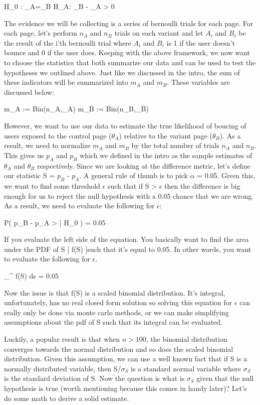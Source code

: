 \beq
    H_0 : \theta_A=\theta_B
\eeq
\beq
   H_A: \theta_B - \theta_A > 0
\eeq

The evidence we will be collecting is a series of bernoulli trials for each page. For each page, let's perform $n_A$
and $n_B$ trials on each variant and let $A_i$ and $B_i$ be the result of the i'th bernoulli trial where $A_i$ and $B_i$
is 1 if the user doesn't bounce and 0 if the user does. Keeping with the above framework, we now want to choose 
the statistics that both summarize our data and can be used to test the hypotheses we outlined above. Just like 
we discussed in the intro, the sum of these indicators will be summarized into $m_A$ and $m_B$. These variables are discussed below:

\beq
    m_A := Bin(n_A,\theta_A)
\eeq
\beq
   m_B := Bin(n_B,\theta_B)
\eeq

However, we want to use our data to estimate the true likelihood of boucing of users exposed to the control page ($\theta_A$) 
relative to the variant page ($\theta_B$). As a result, we need to normalize $m_A$ and $m_B$ by the total number of trials $n_A$
and $n_B$. This gives us $p_A$ and $p_B$ which we defined in the intro as the sample estimates of $\theta_A$ and $\theta_B$ 
respectively. Since we are looking at the difference metric, let's define our statistic S = $p_B$ - $p_A$. A general rule 
of thumb is to pick $\alpha$ = 0.05. Given this, we want to find some threshold $\epsilon$ such that if S > $\epsilon$ then
the difference is big enough for us to reject the null hypothesis with a 0.05 chance that we are wrong. As a result, we need to
evaluate the following for $\epsilon$: 

\beq
P( p_B - p_A > \epsilon | H_0 ) = 0.05
\eeq

If you evaluate the left side of the equation. You basically want to find the area under the PDF of S [ f(S) ]such that it's equal to 0.05. 
In other words, you want to evaluate the following for $\epsilon$. 

\beq
\int_{\epsilon}^{\infty} f(S) ds = 0.05
\eeq

Now the issue is that f(S) is a scaled binomial distribution. It's integral, unfortunately, has no real closed form solution so solving this equation for
$\epsilon$ can really only be done via monte carlo methods, or we can make simplifying assumptions about the pdf of S such that its integral can be evaluated.

Luckily, a popular result is that when $n > 100$, the binomial distribution converges towards the normal distribution and so does the scaled binomial distribution.
Given this assumption, we can use a well known fact that if S is a normally distributed variable, then S/$\sigma_S$ is a standard normal variable where $\sigma_S$ 
is the standard deviation of S. Now the question is what is $\sigma_S$ given that the null hypothesis is true (worth mentioning because this comes in handy later)? 
Let's do some math to derive a solid estimate. 

